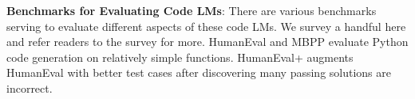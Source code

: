 \documentclass[twoside,11pt,preprint]{article}
\begin{document}
\noindent \textbf{Benchmarks for Evaluating Code LMs}: There are various benchmarks serving to evaluate different aspects of these code LMs. We survey a handful here and refer readers to the survey \citep{zhang2023survey} for more. HumanEval \citep{chen2021evaluating} and MBPP \citep{austin2021program} evaluate Python code generation on relatively simple functions. HumanEval+ \citep{liu2023your} augments HumanEval with better test cases after discovering many passing solutions are incorrect. 


\end{document}
